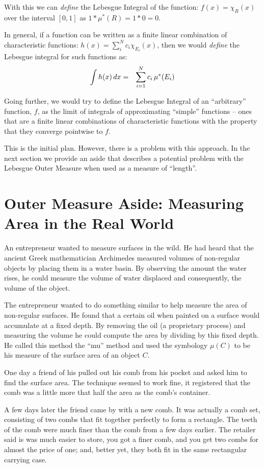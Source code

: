 \documentclass{article}
\begin{document}
With this we can {\em define\/} the Lebesgue Integral of the function: 
$f(x) = \chi_{R}(x)$ over the interval $[0,1]$ 
as $1 * \mu^*(R) = 1 * 0 = 0$.

In general, if a function can be written as a finite linear combination of 
characteristic functions: $h(x) = \sum_i^N c_i \chi_{E_i}(x)$,
then we would {\em define\/} the Lebesgue integral for such functions as:
\begin{eqnarray}
	\int h(x) \, dx & = & \sum_{i=1}^N\limits c_i \, \mu^*(E_i)
\end{eqnarray}

Going further, we would try to define the Lebesgue Integral of an ``arbitrary''
function, $f$, as the limit of integrals of approximating ``simple'' 
functions  -- ones that are a finite linear combinations of characteristic 
functions with the property that they converge pointwise to $f$.

This is the initial plan. However, there is a problem with this approach. 
In the next section we provide an aside that describes a potential problem 
with the Lebesgue Outer Measure when used as a measure of ``length''.

\section{Outer Measure Aside: Measuring Area in the Real World}
An entrepreneur 
wanted to measure surfaces in the wild. He had heard that the 
ancient Greek mathematician Archimedes measured volumes of non-regular objects 
by placing them in a water basin. By observing the amount the water rises, he 
could measure the volume of water displaced and consequently, the volume of the object.

The entrepreneur wanted to do something similar to help measure the area of 
non-regular surfaces. He found that a 
certain oil when painted on a surface would accumulate at a fixed depth. By 
removing the oil (a proprietary process) and measuring the volume he could 
compute the area by dividing by this fixed depth. He called this method the 
``mu'' method and used the symbology $\mu(C)$ to be his measure of the surface 
area of an object $C$.

One day a friend of his pulled out his comb from his pocket and asked him to 
find the surface area. The technique seemed to work fine, it registered that 
the comb was a little more that half the area as the comb's container.

A few days later the friend came by with a new comb. It was actually a comb 
set, consisting of two combs that fit together perfectly to form a rectangle.
The teeth of the comb were much finer than the comb from a few days earlier. 
The retailer said is was much easier to store, you got a finer comb, and you 
get two combs for almost the price of one; and, better yet, they both 
fit in the same rectangular carrying case.
\end{document}
